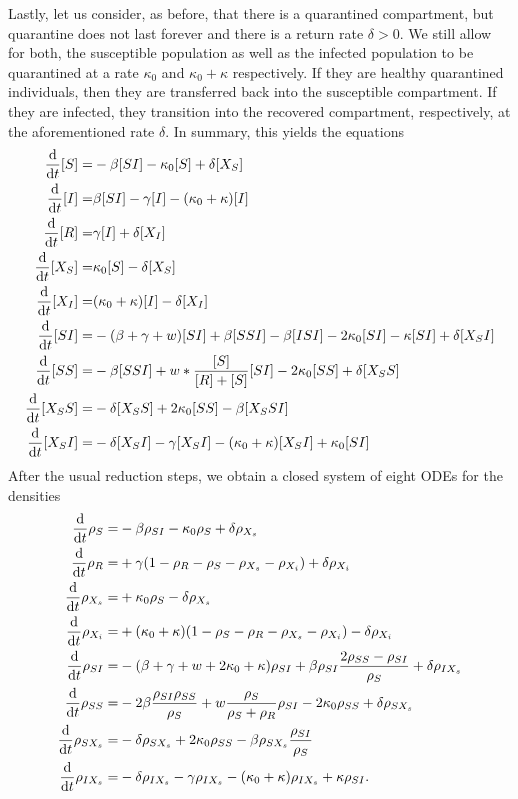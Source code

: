 \documentclass[12pt]{article}
\def\txtd{{\textnormal{d}}}
\begin{document}
Lastly, let us consider, as before, that there is a quarantined compartment, but quarantine does not last forever and there is a return rate $\delta>0$. We still allow for both, the susceptible population as well as the infected population to be quarantined at a rate $\kappa_0$ and $\kappa_0+\kappa$ respectively. If they are healthy quarantined individuals, then they are transferred back into the susceptible compartment. If they are infected, they transition into the recovered compartment, respectively, at the aforementioned rate $\delta$. In summary, this yields the equations
\begin{align*}
 \frac{\txtd }{\txtd t} [S]
 =&
 -\beta [SI] - \kappa_0[S] +\delta[X_S]
 \\
 \frac{\txtd }{\txtd t} [I]
 =&
 \beta [SI] - \gamma [I] - (\kappa_0+\kappa)[I] 
 \\
 \frac{\txtd }{\txtd t} [R]
 =&
\gamma [I] +\delta[X_I]
 \\
 \frac{\txtd }{\txtd t} [X_S]
 =&
\kappa_0 [S] - \delta[X_S]
 \\
 \frac{\txtd }{\txtd t} [X_I]
 =&
(\kappa_0 +\kappa) [I] - \delta[X_I]
 \\
 \frac{\txtd }{\txtd t} [SI]
 =&
 -(\beta+\gamma+w)[SI] + \beta[SSI] -\beta[ISI] -2\kappa_0 [SI] - \kappa [SI] + \delta [X_{S}I] 
 \\
 \frac{\txtd }{\txtd t} [SS]
 =&
- \beta [SSI] + w*\frac{[S]}{[R]+[S]} [SI] -2\kappa_0 [SS] + \delta[X_{S}S]  \\
 \frac{\txtd }{\txtd t} [X_{S}S]
 =&
 -\delta [X_{S}S] + 2\kappa_0[SS]
 -\beta [X_{S}SI]
 \\
 \frac{\txtd }{\txtd t} [X_{S}I]
 =&
 -\delta[X_{S}I] - \gamma [X_{S}I] -(\kappa_0+\kappa)[X_{S}I] + \kappa_0 [SI]
 \end{align*}
After the usual reduction steps, we obtain a closed system of eight ODEs for the densities
 \begin{align*}
 \frac{\txtd }{\txtd t}{\rho_S}=&-\beta \rho_{SI}-\kappa_0\rho_S+ \delta \rho_{X_s}\\
\frac{\txtd }{\txtd t}{\rho_{R}}=&+
  \gamma(1-\rho_{R}-\rho_{S}-\rho_{X_s}-\rho_{X_i}) +\delta \rho_{X_i}\\
  \frac{\txtd }{\txtd t} {\rho_{X_s}}=&+
  \kappa_0\rho_S - \delta \rho_{X_s}\\
  \frac{\txtd }{\txtd t} {\rho_{X_i}}= &
  +(\kappa_0+\kappa)(1-\rho_{S}-\rho_{R}-\rho_{X_s}-\rho_{X_i}) - \delta \rho_{X_i}\\
 \frac{\txtd }{\txtd t}{\rho_{SI}}=&
  -(\beta+\gamma+w+2\kappa_0+\kappa)\rho_{SI}+\beta\rho_{SI}\frac{2\rho_{SS}-\rho_{SI}}{\rho_S}+ \delta \rho_{IX_s}\\
 \frac{\txtd }{\txtd t}{\rho_{SS}}=& - 2\beta\frac{\rho_{SI}\rho_{SS}}{\rho_{S}}+w\frac{\rho_S}{\rho_S+\rho_{R}}\rho_{SI} - 2\kappa_0\rho_{SS} + \delta\rho_{SX_{s}}\\
 \frac{\txtd }{\txtd t}{\rho_{SX_{s}}}=&
  -\delta\rho_{SX_s}+2\kappa_0\rho_{SS}-\beta\rho_{SX_{s}}\frac{\rho_{SI}}{\rho_S}\\
 \frac{\txtd }{\txtd t}{\rho_{IX_{s}}}=&
  -\delta\rho_{IX_{s}}-\gamma\rho_{IX_{s}}-(\kappa_0+\kappa)\rho_{IX_{s}}+\kappa\rho_{SI}.
 \end{align*}
\end{document}
